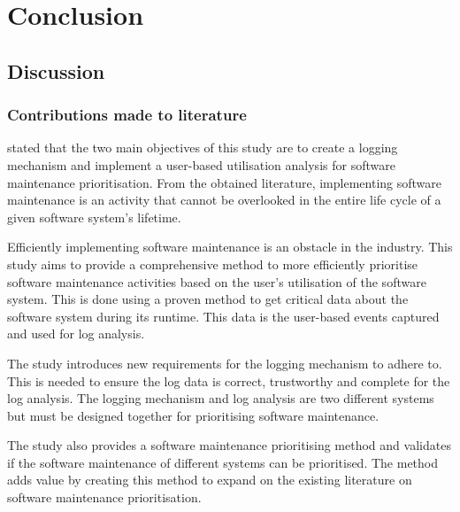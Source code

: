 \chapter{Conclusion}
\label{chap:4}

\section{Discussion}

\subsection{Contributions made to literature}
 stated that the two main objectives of this study are to create a logging mechanism and implement a user-based utilisation analysis for software maintenance prioritisation. From the obtained literature, implementing software maintenance is an activity that cannot be overlooked in the entire life cycle of a given software system's lifetime. \par Efficiently implementing software maintenance is an obstacle in the industry. This study aims to provide a comprehensive method to more efficiently prioritise software maintenance activities based on the user's utilisation of the software system. This is done using a proven method to get critical data about the software system during its runtime. This data is the user-based events captured and used for log analysis.\par The study introduces new requirements for the logging mechanism to adhere to. This is needed to ensure the log data is correct, trustworthy and complete for the log analysis. The logging mechanism and log analysis are two different systems but must be designed together for prioritising software maintenance.\par The study also provides a software maintenance prioritising method and validates if the software maintenance of different systems can be prioritised. The method adds value by creating this method to expand on the existing literature on software maintenance prioritisation.

